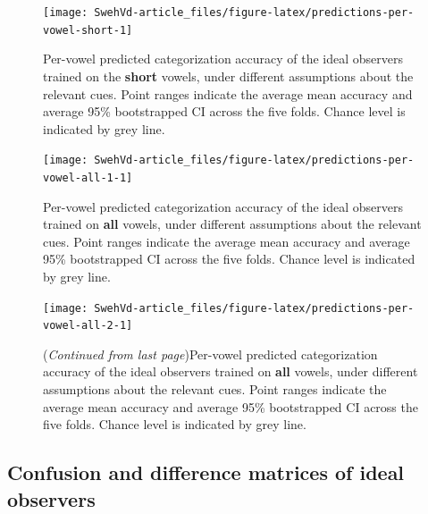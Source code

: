 \documentclass[utf8]{frontiersSCNS}
\begin{document}
\begin{figure}

{\centering \texttt{[image: SwehVd-article\_files/figure-latex/predictions-per-vowel-short-1]} 

}

\caption{Per-vowel predicted categorization accuracy of the ideal observers trained on the \textbf{short} vowels, under different assumptions about the relevant cues. Point ranges indicate the average mean accuracy and average 95\% bootstrapped CI across the five folds. Chance level is indicated by grey line.}\label{fig:predictions-per-vowel-short}
\end{figure}



\begin{figure}

{\centering \texttt{[image: SwehVd-article\_files/figure-latex/predictions-per-vowel-all-1-1]} 

}

\caption{Per-vowel predicted categorization accuracy of the ideal observers trained on \textbf{all} vowels, under different assumptions about the relevant cues. Point ranges indicate the average mean accuracy and average 95\% bootstrapped CI across the five folds. Chance level is indicated by grey line.}\label{fig:predictions-per-vowel-all-1}
\end{figure}



\begin{figure}

{\centering \texttt{[image: SwehVd-article\_files/figure-latex/predictions-per-vowel-all-2-1]} 

}

\caption{(\emph{Continued from last page})Per-vowel predicted categorization accuracy of the ideal observers trained on \textbf{all} vowels, under different assumptions about the relevant cues. Point ranges indicate the average mean accuracy and average 95\% bootstrapped CI across the five folds. Chance level is indicated by grey line.}\label{fig:predictions-per-vowel-all-2}
\end{figure}

\newpage

\hypertarget{sec:confusion}{%
\subsection*{Confusion and difference matrices of ideal observers}\label{sec:confusion}}
\end{document}
